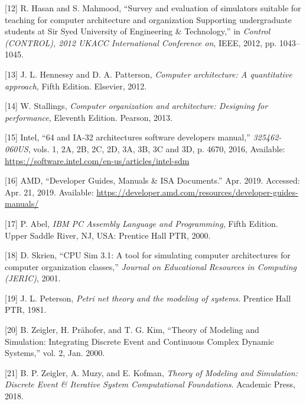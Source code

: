 \documentclass[12pt,twoside]{templates/unerthesis}
\begin{document}
\leavevmode\hypertarget{ref-hasan_survey_2012}{}%
{[}12{]} R. Hasan and S. Mahmood, ``Survey and evaluation of simulators suitable for teaching for computer architecture and organization Supporting undergraduate students at Sir Syed University of Engineering \& Technology,'' in \emph{Control (CONTROL), 2012 UKACC International Conference on}, IEEE, 2012, pp. 1043--1045.

\leavevmode\hypertarget{ref-hennessy_computer_2012}{}%
{[}13{]} J. L. Hennessy and D. A. Patterson, \emph{Computer architecture: A quantitative approach}, Fifth Edition. Elsevier, 2012.

\leavevmode\hypertarget{ref-stallings_computer_2013}{}%
{[}14{]} W. Stallings, \emph{Computer organization and architecture: Designing for performance}, Eleventh Edition. Pearson, 2013.

\leavevmode\hypertarget{ref-intel_64_2016}{}%
{[}15{]} Intel, ``64 and IA-32 architectures software developers manual,'' \emph{325462-060US}, vols. 1, 2A, 2B, 2C, 2D, 3A, 3B, 3C and 3D, p. 4670, 2016, Available: \url{https://software.intel.com/en-us/articles/intel-sdm}

\leavevmode\hypertarget{ref-amd_developer_2019}{}%
{[}16{]} AMD, ``Developer Guides, Manuals \& ISA Documents.'' Apr. 2019. Accessed: Apr. 21, 2019. Available: \url{https://developer.amd.com/resources/developer-guides-manuals/}

\leavevmode\hypertarget{ref-abel_ibm_2000}{}%
{[}17{]} P. Abel, \emph{IBM PC Assembly Language and Programming}, Fifth Edition. Upper Saddle River, NJ, USA: Prentice Hall PTR, 2000.

\leavevmode\hypertarget{ref-skrien_cpu_2001}{}%
{[}18{]} D. Skrien, ``CPU Sim 3.1: A tool for simulating computer architectures for computer organization classes,'' \emph{Journal on Educational Resources in Computing (JERIC)}, 2001.

\leavevmode\hypertarget{ref-peterson_petri_1981}{}%
{[}19{]} J. L. Peterson, \emph{Petri net theory and the modeling of systems}. Prentice Hall PTR, 1981.

\leavevmode\hypertarget{ref-zeigler_theory_2000}{}%
{[}20{]} B. Zeigler, H. Prähofer, and T. G. Kim, ``Theory of Modeling and Simulation: Integrating Discrete Event and Continuous Complex Dynamic Systems,'' vol. 2, Jan. 2000.

\leavevmode\hypertarget{ref-zeigler_theory_2018}{}%
{[}21{]} B. P. Zeigler, A. Muzy, and E. Kofman, \emph{Theory of Modeling and Simulation: Discrete Event \& Iterative System Computational Foundations}. Academic Press, 2018.
\end{document}
